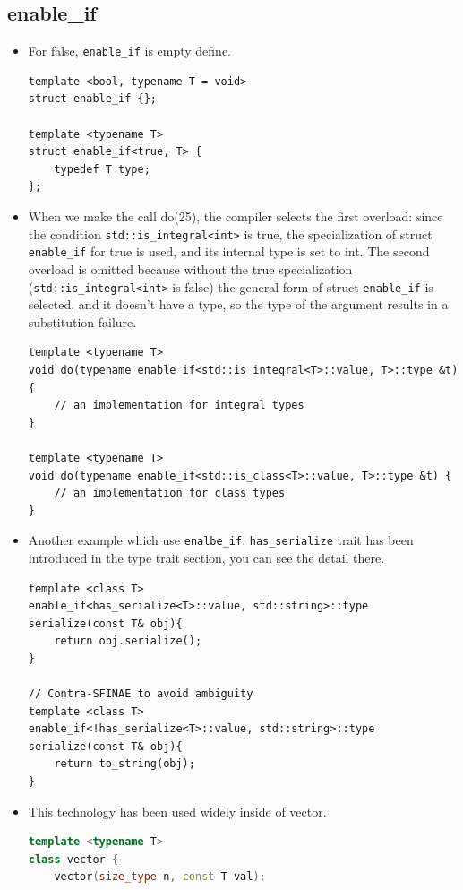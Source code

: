 \documentclass[a4paper,11pt,twoside]{book}
\begin{document}
\subsection{enable\_if}
\begin{itemize}
	
	\item For false, \texttt{enable\_if} is empty define.
\begin{lstlisting}[numbers=none]
template <bool, typename T = void>
struct enable_if {};

template <typename T>
struct enable_if<true, T> {
	typedef T type;
};	
\end{lstlisting}	

\item When we make the call do(25), the compiler selects the first overload: since the condition \texttt{std::is\_integral<int>} is true, the specialization of struct \texttt{enable\_if} for true is used, and its internal type is set to int. The second overload is omitted because without the true specialization (\texttt{std::is\_integral<int>} is false) the general form of struct \texttt{enable\_if} is selected, and it doesn't have a type, so the type of the argument results in a substitution failure.

\begin{lstlisting}[numbers=none]
template <typename T>
void do(typename enable_if<std::is_integral<T>::value, T>::type &t){
	// an implementation for integral types 
}

template <typename T>
void do(typename enable_if<std::is_class<T>::value, T>::type &t) {
	// an implementation for class types
}		
\end{lstlisting}	
	
	\item Another example which use \texttt{enalbe\_if}. \texttt{has\_serialize} trait has been introduced in the type trait section, you can see the detail there. 
	
\begin{lstlisting}[numbers=none]
template <class T>
enable_if<has_serialize<T>::value, std::string>::type
serialize(const T& obj){
	return obj.serialize();
}

// Contra-SFINAE to avoid ambiguity
template <class T>
enable_if<!has_serialize<T>::value, std::string>::type 
serialize(const T& obj){
	return to_string(obj);
}	
\end{lstlisting}	
	
	\item This technology has been used widely inside of vector.
\begin{lstlisting}[frame=single, language=c++]
template <typename T>
class vector {
	vector(size_type n, const T val);
	

\end{lstlisting}
\end{itemize}
\end{document}
